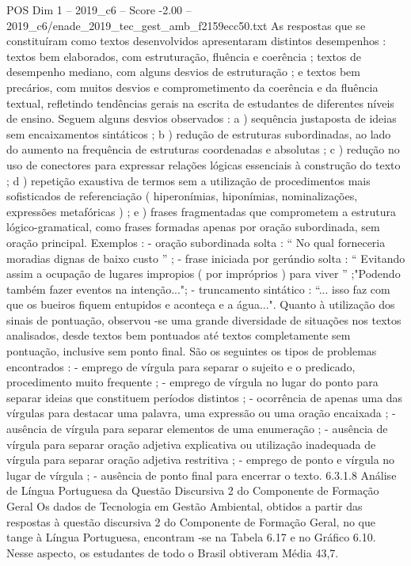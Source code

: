 \begin{textsample}{POS Dim 1 – 2019\_c6 – Score -2.00 – 2019\_c6/enade\_2019\_tec\_gest\_amb\_f2159ecc50.txt}
As respostas que se constituíram como textos desenvolvidos apresentaram distintos desempenhos : textos bem elaborados, com estruturação, fluência e coerência ; textos de desempenho mediano, com alguns desvios de estruturação ; e textos bem precários, com muitos desvios e comprometimento da coerência e da fluência textual, refletindo tendências gerais na escrita de estudantes de diferentes níveis de ensino.
Seguem alguns desvios observados : a ) sequência justaposta de ideias sem encaixamentos sintáticos ; b ) redução de estruturas subordinadas, ao lado do aumento na frequência de estruturas coordenadas e absolutas ; c ) redução no uso de conectores para expressar relações lógicas essenciais à construção do texto ; d ) repetição exaustiva de termos sem a utilização de procedimentos mais sofisticados de referenciação ( hiperonímias, hiponímias, nominalizações, expressões metafóricas ) ; e ) frases fragmentadas que comprometem a estrutura lógico-gramatical, como frases formadas apenas por oração subordinada, sem oração principal.
Exemplos : - oração subordinada solta : “ No qual forneceria moradias dignas de baixo custo ” ; - frase iniciada por gerúndio solta : “ Evitando assim a ocupação de lugares impropios ( por impróprios ) para viver ” ;"Podendo também fazer eventos na intenção..."; - truncamento sintático : “... isso faz com que os bueiros fiquem entupidos e aconteça e a água...".
Quanto à utilização dos sinais de pontuação, observou -se uma grande diversidade de situações nos textos analisados, desde textos bem pontuados até textos completamente sem pontuação, inclusive sem ponto final.
São os seguintes os tipos de problemas encontrados : - emprego de vírgula para separar o sujeito e o predicado, procedimento muito frequente ; - emprego de vírgula no lugar do ponto para separar ideias que constituem períodos distintos ; - ocorrência de apenas uma das vírgulas para destacar uma palavra, uma expressão ou uma oração encaixada ; - ausência de vírgula para separar elementos de uma enumeração ; - ausência de vírgula para separar oração adjetiva explicativa ou utilização inadequada de vírgula para separar oração adjetiva restritiva ; - emprego de ponto e vírgula no lugar de vírgula ; - ausência de ponto final para encerrar o texto. 6.3.1.8 Análise de Língua Portuguesa da Questão Discursiva 2 do Componente de Formação Geral Os dados de Tecnologia em Gestão Ambiental, obtidos a partir das respostas à questão discursiva 2 do Componente de Formação Geral, no que tange à Língua Portuguesa, encontram -se na Tabela 6.17 e no Gráfico 6.10.
Nesse aspecto, os estudantes de todo o Brasil obtiveram Média 43,7.

\end{textsample}
